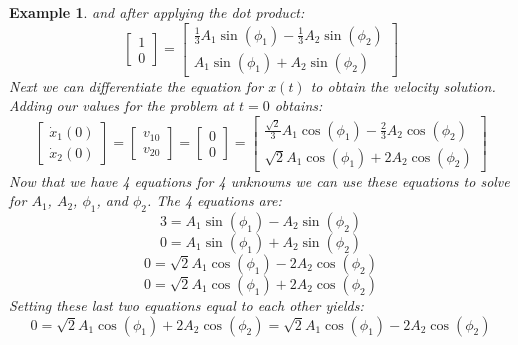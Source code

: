 \documentclass[12pt,letter]{article}
\newtheorem{ex}{Example}
\numberwithin{ex}{section} %
\newenvironment{example}{\begin{mdframed}[middlelinewidth=0.5mm]\begin{ex}\normalfont}{\end{ex}\end{mdframed}}
\numberwithin{re}{section} %
\begin{document}
\begin{example}
and after applying the dot product:
\begin{equation}
	 \begin{bmatrix} 1 \\  0 \end{bmatrix} =  \begin{bmatrix} \frac{1}{3}A_1 \sin (\phi_1 ) -\frac{1}{3}A_2 \sin (\phi_2)\\ A_1 \sin (\phi_1 )+A_2 \sin (\phi_2 )\end{bmatrix}
\end{equation}
Next we can differentiate the equation for $x(t)$ to obtain the velocity solution. Adding our values for the problem at $t=0$ obtains:
\begin{equation}
	 \begin{bmatrix} \dot{x}_1(0) \\  \dot{x}_2(0) \end{bmatrix}  = \begin{bmatrix} v_{10} \\  v_{20} \end{bmatrix} = \begin{bmatrix} 0 \\  0 \end{bmatrix} =   \begin{bmatrix} \frac{\sqrt{2}}{3}A_1 \cos (\phi_1 ) -\frac{2}{3}A_2 \cos (\phi_2)\\ \sqrt{2}A_1 \cos (\phi_1 )+2 A_2 \cos (\phi_2 )\end{bmatrix}
\end{equation}
Now that we have 4 equations for 4 unknowns we can use these equations to solve for $A_1$,  $A_2$, $\phi_1$,  and $\phi_2$. The 4 equations are:
\begin{equation}
3= A_1 \sin (\phi_1 ) - A_2 \sin (\phi_2)
\end{equation}
\begin{equation}
0= A_1 \sin (\phi_1 ) + A_2 \sin (\phi_2)
\end{equation}
\begin{equation}
0= \sqrt{2}A_1 \cos (\phi_1 ) - 2A_2 \cos (\phi_2)
\end{equation}
\begin{equation}
0= \sqrt{2}A_1 \cos (\phi_1 ) + 2A_2 \cos (\phi_2)
\end{equation}
Setting these last two equations equal to each other yields:
\begin{equation}
0= \sqrt{2}A_1 \cos (\phi_1 ) + 2A_2 \cos (\phi_2) = \sqrt{2}A_1 \cos (\phi_1 ) - 2A_2 \cos (\phi_2)
\end{equation}

\end{example}
\end{document}
